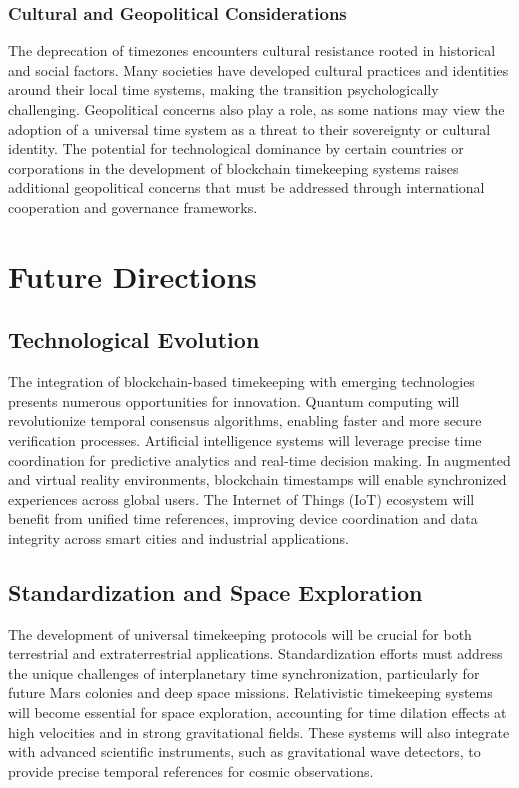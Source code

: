 \documentclass[12pt]{report}
\begin{document}
\subsection{Cultural and Geopolitical Considerations}
The deprecation of timezones encounters cultural resistance rooted in historical and social factors. Many societies have developed cultural practices and identities around their local time systems, making the transition psychologically challenging. Geopolitical concerns also play a role, as some nations may view the adoption of a universal time system as a threat to their sovereignty or cultural identity. The potential for technological dominance by certain countries or corporations in the development of blockchain timekeeping systems raises additional geopolitical concerns that must be addressed through international cooperation and governance frameworks.

\chapter{Future Directions}

\section{Technological Evolution}
The integration of blockchain-based timekeeping with emerging technologies presents numerous opportunities for innovation. Quantum computing will revolutionize temporal consensus algorithms, enabling faster and more secure verification processes. Artificial intelligence systems will leverage precise time coordination for predictive analytics and real-time decision making. In augmented and virtual reality environments, blockchain timestamps will enable synchronized experiences across global users. The Internet of Things (IoT) ecosystem will benefit from unified time references, improving device coordination and data integrity across smart cities and industrial applications.

\section{Standardization and Space Exploration}
The development of universal timekeeping protocols will be crucial for both terrestrial and extraterrestrial applications. Standardization efforts must address the unique challenges of interplanetary time synchronization, particularly for future Mars colonies and deep space missions. Relativistic timekeeping systems will become essential for space exploration, accounting for time dilation effects at high velocities and in strong gravitational fields. These systems will also integrate with advanced scientific instruments, such as gravitational wave detectors, to provide precise temporal references for cosmic observations.
\end{document}
